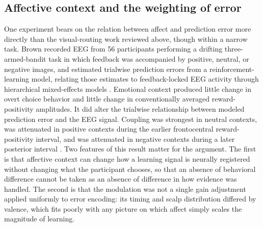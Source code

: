 \documentclass[11pt]{article}
\begin{document}
\subsection{Affective context and the weighting of error}

One experiment bears on the relation between affect and prediction error more directly than the visual-routing work reviewed above, though within a narrow task. Brown recorded EEG from 56 participants performing a drifting three-armed-bandit task in which feedback was accompanied by positive, neutral, or negative images, and estimated trialwise prediction errors from a reinforcement-learning model, relating those estimates to feedback-locked EEG activity through hierarchical mixed-effects models \citep{Brown2026}. Emotional context produced little change in overt choice behavior and little change in conventionally averaged reward-positivity amplitudes. It did alter the trialwise relationship between modeled prediction error and the EEG signal. Coupling was strongest in neutral contexts, was attenuated in positive contexts during the earlier frontocentral reward-positivity interval, and was attenuated in negative contexts during a later posterior interval \citep{Brown2026}. Two features of this result matter for the argument. The first is that affective context can change how a learning signal is neurally registered without changing what the participant chooses, so that an absence of behavioral difference cannot be taken as an absence of difference in how evidence was handled. The second is that the modulation was not a single gain adjustment applied uniformly to error encoding: its timing and scalp distribution differed by valence, which fits poorly with any picture on which affect simply scales the magnitude of learning.
\end{document}
